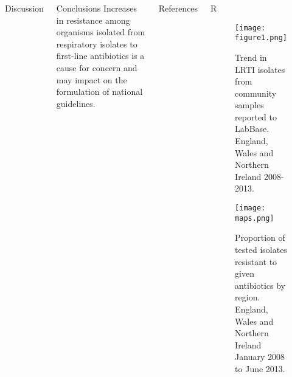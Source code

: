 \documentclass[final, 14pt]{beamer}
\begin{document}
\begin{frame}
\begin{columns}[t]
\begin{minipage}[T]{.95\textwidth}
\begin{block}{Discussion}
\end{block}
     \vfill
\begin{block}{Conclusions}
  Increases in resistance among organisms isolated from respiratory isolates to first-line antibiotics is a cause for concern and may impact on the formulation of national guidelines.  

        \vspace{1 cm}
\end{block}
     \vfill
  \begin{block}{References}
   
\footnotesize{}
   \vfill
      \vspace{1 cm}
  \end{block}
\end{minipage}
    
 \begin{minipage}[T]{.95\textwidth} %
  \begin{block}{\textcolor{comp_blue}{R}}
  
    \begin{figure}
   \texttt{[image: figure1.png]}
   \caption{Trend in LRTI isolates from community samples reported to LabBase. England, Wales and Northern Ireland 2008-2013.}
   \label{fig:fig1}
   \end{figure}
   \vspace{2.5 cm}
  \vfill   
   \begin{figure}
   \texttt{[image: maps.png]}
   \caption{Proportion of tested isolates resistant to given antibiotics by region. England, Wales and Northern Ireland January 2008 to June 2013.}
   \label{fig:maps}
   \end{figure}
   \vspace{2.5 cm}
  \end{block}
  \vfill
\end{minipage}  

 \end{columns}

\end{frame}
\end{document}
